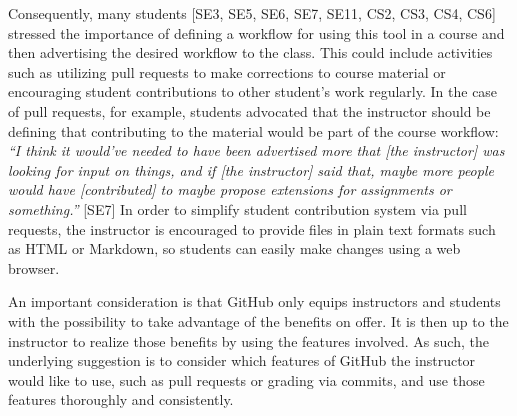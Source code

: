 Consequently, many students [SE3, SE5, SE6, SE7, SE11, CS2, CS3, CS4, CS6] stressed the importance of defining a workflow for using this tool in a course and then advertising the desired workflow to the class. This could include activities such as utilizing pull requests to make corrections to course material or encouraging student contributions to other student's work regularly. In the case of pull requests, for example, students advocated that the instructor should be defining that contributing to the material would be part of the course workflow: \textit{``I think it would've needed to have been advertised more that [the instructor] was looking for input on things, and if [the instructor] said that, maybe more people would have [contributed] to maybe propose extensions for assignments or something.''} [SE7] In order to simplify student contribution system via pull requests, the instructor is encouraged to provide files in plain text formats such as HTML or Markdown, so students can easily make changes using a web browser.

An important consideration is that GitHub only equips instructors and students with the possibility to take advantage of the benefits on offer. It is then up to the instructor to realize those benefits by using the features involved. As such, the underlying suggestion is to consider which features of GitHub the instructor would like to use, such as pull requests or grading via commits, and use those features thoroughly and consistently. \\


